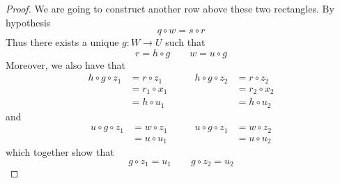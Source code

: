 \begin{proof}
	We are going to construct another row above these two rectangles. By hypothesis 
	\[q\circ w = s\circ r\]
	Thus there exists a unique $g\colon W\to U$ such that
	\[r=h\circ g \qquad w=u\circ g\]
	Moreover, we also have that
	\[\begin{split}h\circ g \circ z_1&=r \circ z_1\\&= r_1\circ x_1 \\&=h\circ u_1
	\end{split}\qquad\begin{split}h\circ g \circ z_2&=r \circ z_2\\&= r_2\circ x_2 \\&=h\circ u_2
	\end{split}\]
	and 
	\[\begin{split}u\circ g \circ z_1&=w \circ z_1\\&= u\circ u_1 
	\end{split} \qquad \begin{split}u\circ g \circ z_1&=w \circ z_2\\&= u\circ u_2
	\end{split}\]
	which together show that
	\[g\circ z_1=u_1 \qquad g\circ z_2=u_2\]
	

\end{proof}
